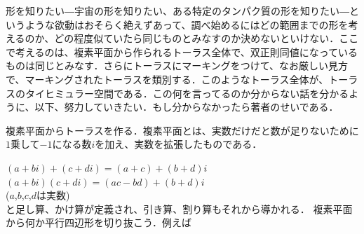 


形を知りたい―宇宙の形を知りたい、ある特定のタンパク質の形を知りたい―というような欲動はおそらく絶えずあって、調べ始めるにはどの範囲までの形を考えるのか、どの程度似ていたら同じものとみなすのか決めないといけない．ここで考えるのは、複素平面から作られるトーラス全体で、双正則同値になっているものは同じとみなす．さらにトーラスにマーキングをつけて、なお厳しい見方で、マーキングされたトーラスを類別する．このようなトーラス全体が、トーラスのタイヒミュラー空間である．この何を言ってるのか分からない話を分かるように、以下、努力していきたい．もし分からなかったら著者のせいである．

複素平面からトーラスを作る．複素平面とは、実数だけだと数が足りないために$1$乗して$-1$になる数$i$を加え、実数を拡張したものである．
\begin{figure} 
\end{figure}
$(a+bi)+(c+di)=(a+c)+(b+d)i$\\
$(a+bi)(c+di)=(ac-bd)+(b+d)i$\\
($a$,$b$,$c$,$d$は実数)\\
と足し算、かけ算が定義され、引き算、割り算もそれから導かれる．
複素平面から何か平行四辺形を切り抜こう．例えば\\

